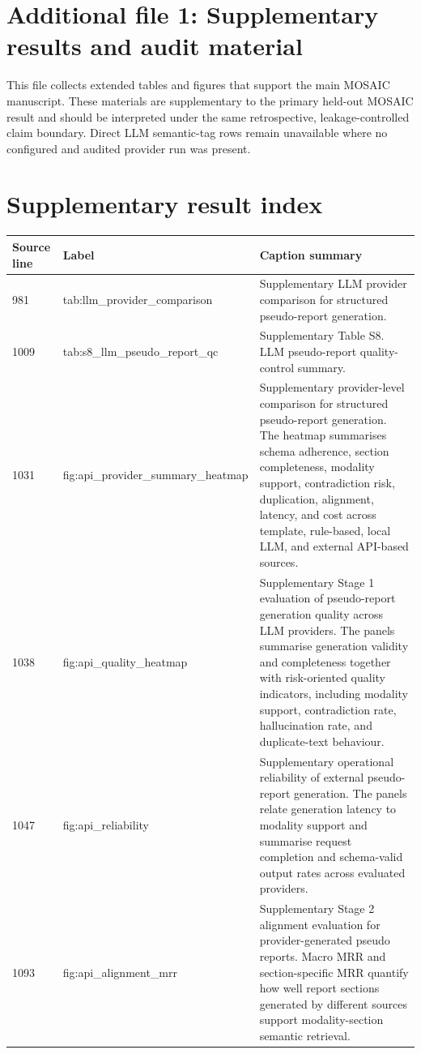 \documentclass[11pt,a4paper]{article}
\begin{document}
\section*{Additional file 1: Supplementary results and audit material}
This file collects extended tables and figures that support the main MOSAIC manuscript. These materials are supplementary to the primary held-out MOSAIC result and should be interpreted under the same retrospective, leakage-controlled claim boundary. Direct LLM semantic-tag rows remain unavailable where no configured and audited provider run was present.

\section*{Supplementary result index}
\begin{small}
\begin{longtable}{p{1.7cm}p{4.2cm}p{9.0cm}}
\toprule
\textbf{Source line} & \textbf{Label} & \textbf{Caption summary} \\
\midrule
981 & tab:llm\_provider\_comparison & Supplementary LLM provider comparison for structured pseudo-report generation. \\
1009 & tab:s8\_llm\_pseudo\_report\_qc & Supplementary Table S8. LLM pseudo-report quality-control summary. \\
1031 & fig:api\_provider\_summary\_heatmap & Supplementary provider-level comparison for structured pseudo-report generation. The heatmap summarises schema adherence, section completeness, modality support, contradiction risk, duplication, alignment, latency, and cost across template, rule-based, local LLM, and external API-based sources. \\
1038 & fig:api\_quality\_heatmap & Supplementary Stage 1 evaluation of pseudo-report generation quality across LLM providers. The panels summarise generation validity and completeness together with risk-oriented quality indicators, including modality support, contradiction rate, hallucination rate, and duplicate-text behaviour. \\
1047 & fig:api\_reliability & Supplementary operational reliability of external pseudo-report generation. The panels relate generation latency to modality support and summarise request completion and schema-valid output rates across evaluated providers. \\
1093 & fig:api\_alignment\_mrr & Supplementary Stage 2 alignment evaluation for provider-generated pseudo reports. Macro MRR and section-specific MRR quantify how well report sections generated by different sources support modality-section semantic retrieval. \\

\end{longtable}
\end{small}
\end{document}
